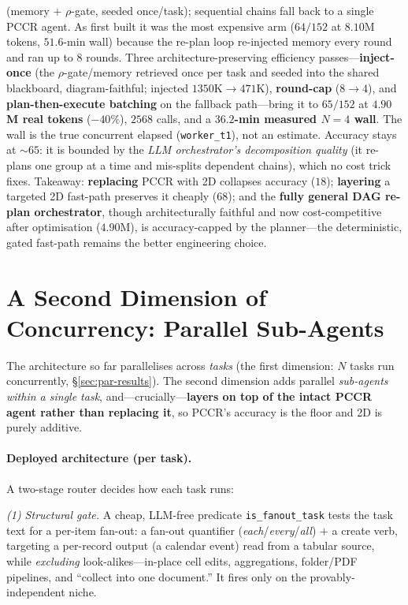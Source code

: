 \documentclass[10pt,twocolumn]{article}
\newcommand{\code}[1]{\texttt{\small #1}}
\begin{document}
\begin{table}[t]
{(memory $+$ $\rho$-gate, seeded once/task); sequential chains fall back to a single PCCR agent. As
first built it was the most expensive arm ($64/152$ at $8.10$M tokens, $51.6$-min wall) because the
re-plan loop re-injected memory every round and ran up to $8$ rounds. Three architecture-preserving
efficiency passes---\textbf{inject-once} (the $\rho$-gate/memory retrieved once per task and seeded
into the shared blackboard, diagram-faithful; injected $1350$K$\to$$471$K), \textbf{round-cap} ($8\to4$),
and \textbf{plan-then-execute batching} on the fallback path---bring it to $65/152$ at
\textbf{$4.90$M real tokens} ($-40\%$), $2568$ calls, and a \textbf{$36.2$-min measured $N{=}4$ wall}.
The wall is the true concurrent elapsed (\code{worker\_t1}), not an estimate. Accuracy stays at
${\sim}65$: it is bounded by the \emph{LLM orchestrator's decomposition quality} (it re-plans one group
at a time and mis-splits dependent chains), which no cost trick fixes. Takeaway: \textbf{replacing}
PCCR with 2D collapses accuracy ($18$); \textbf{layering} a targeted 2D fast-path preserves it cheaply
($68$); and the \textbf{fully general DAG re-plan orchestrator}, though architecturally faithful and now
cost-competitive after optimisation ($4.90$M), is accuracy-capped by the planner---the deterministic,
gated fast-path remains the better engineering choice.}
\label{tab:final}
\end{table}

\section{A Second Dimension of Concurrency: Parallel Sub-Agents}\label{sec:twod}
The architecture so far parallelises across \emph{tasks} (the first dimension: $N$ tasks run
concurrently, \S\ref{sec:par-results}). The second dimension adds parallel \emph{sub-agents within a
single task}, and---crucially---\textbf{layers on top of the intact PCCR agent rather than replacing
it}, so PCCR's accuracy is the floor and 2D is purely additive.

\paragraph{Deployed architecture (per task).} A two-stage router decides how each task runs:

\emph{(1) Structural gate.} A cheap, LLM-free predicate \code{is\_fanout\_task} tests the task text
for a per-item fan-out: a fan-out quantifier (\emph{each}/\emph{every}/\emph{all}) $+$ a create verb,
targeting a per-record output (a calendar event) read from a tabular source, while \emph{excluding}
look-alikes---in-place cell edits, aggregations, folder/PDF pipelines, and ``collect into one
document.'' It fires only on the provably-independent niche.
\end{document}
